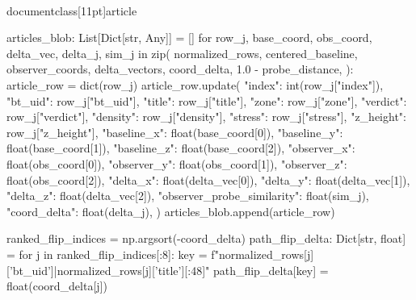 \\documentclass[11pt]{article}
\begin{document}
\begin{CodeBlock}
        articles_blob: List[Dict[str, Any]] = []
        for row_j, base_coord, obs_coord, delta_vec, delta_j, sim_j in zip(
            normalized_rows,
            centered_baseline,
            observer_coords,
            delta_vectors,
            coord_delta,
            1.0 - probe_distance,
        ):
            article_row = dict(row_j)
            article_row.update(
                {
                    "index": int(row_j["index"]),
                    "bt_uid": row_j["bt_uid"],
                    "title": row_j["title"],
                    "zone": row_j["zone"],
                    "verdict": row_j["verdict"],
                    "density": row_j["density"],
                    "stress": row_j["stress"],
                    "z_height": row_j["z_height"],
                    "baseline_x": float(base_coord[0]),
                    "baseline_y": float(base_coord[1]),
                    "baseline_z": float(base_coord[2]),
                    "observer_x": float(obs_coord[0]),
                    "observer_y": float(obs_coord[1]),
                    "observer_z": float(obs_coord[2]),
                    "delta_x": float(delta_vec[0]),
                    "delta_y": float(delta_vec[1]),
                    "delta_z": float(delta_vec[2]),
                    "observer_probe_similarity": float(sim_j),
                    "coord_delta": float(delta_j),
                }
            )
            articles_blob.append(article_row)

        ranked_flip_indices = np.argsort(-coord_delta)
        path_flip_delta: Dict[str, float] = {}
        for j in ranked_flip_indices[:8]:
            key = f"{normalized_rows[j]['bt_uid']}|{normalized_rows[j]['title'][:48]}"
            path_flip_delta[key] = float(coord_delta[j])


\end{CodeBlock}
\end{document}

